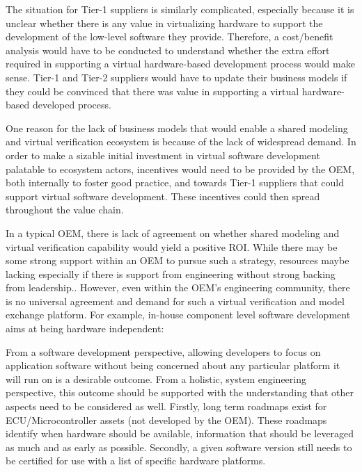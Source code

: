 The situation for Tier-1 suppliers is similarly complicated, especially because it is unclear whether there is any value in virtualizing hardware to support the development of the low-level software they provide. Therefore, a cost/benefit analysis would have to be conducted to understand whether the extra effort required in supporting a virtual hardware-based development process would make sense. 
Tier-1 and Tier-2 suppliers would have to update their business models if they could be convinced that there was value in supporting a virtual hardware-based developed process.

One reason for the lack of business models that would enable a shared modeling and virtual verification ecosystem is because of the lack of widespread  demand. In order to make a sizable initial investment in virtual software development palatable to ecosystem actors, incentives would need to be provided by the OEM, both internally to foster good practice, and towards Tier-1 suppliers that could support virtual software development. These incentives could then spread throughout the value chain.

In a typical OEM, there is lack of agreement on whether shared modeling and virtual verification capability would yield a positive ROI. While there may be some strong support within an OEM to pursue such a strategy, resources maybe lacking especially if there is support from engineering without strong backing from leadership.. However, even within the OEM’s engineering community, there is no universal agreement and demand for such a virtual verification and model exchange platform. For example, in-house component level software development aims at being hardware independent:


From a software development perspective,
allowing developers to focus on application software without being concerned about any particular platform it will run on
is a desirable outcome.
From a holistic, system engineering perspective, this outcome should be supported with the understanding that other aspects need to be considered as well. Firstly, long term roadmaps exist for ECU/Microcontroller assets (not developed by the OEM). These roadmaps identify when hardware should be available, information that should be leveraged as much and as early as possible. Secondly, a given software version still needs to be certified for use with a list of specific hardware platforms.

